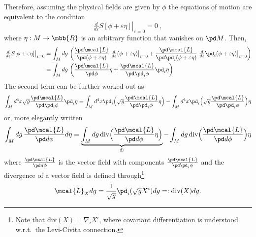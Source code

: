 \documentclass[11pt]{article}
\begin{document}
Therefore, assuming the physical fields are given by $\phi$ the 
equations of motion are equivalent to the condition
%
\begin{equation}\label{eq:ELeqs_cond}
	\left.\tfrac{d}{d\varepsilon} S[\phi + 
	\varepsilon\eta]\right|_{\varepsilon=0} = 0~,
\end{equation}
where $\eta : M \to \mbb{R}$ is an arbitrary function that 
vanishes on $\pd M$. Then,
%
\begin{align*}
	\left.\tfrac{d}{d\varepsilon} S[\phi + 
	\varepsilon\eta]\right|_{\varepsilon=0}
	&= \int_M dg\, \left(\frac{\pd\mcal{L}}{\pd(\phi + 
			\varepsilon\eta)} \left.\tfrac{d}{d\varepsilon}(\phi + 
		\varepsilon\eta)\right|_{\varepsilon=0} +
		\frac{\pd\mcal{L}}{\pd\pd_i(\phi+\varepsilon\eta)} 
		\left.\tfrac{d}{d\varepsilon}\pd_i(\phi + 
		\varepsilon\eta)\right|_{\varepsilon=0} \right) \\
	&= \int_M dg\, \left(\frac{\pd\mcal{L}}{\pd\phi}\eta + 
		\frac{\pd\mcal{L}}{\pd\pd_i\phi} \pd_i\eta \right) 
\end{align*}
The second term can be further worked out as
%
\begin{displaymath}
	\int_M d^4x \sqrt{g} \frac{\pd\mcal{L}}{\pd\pd_i\phi} 
	\pd_i\eta = \int_M d^4x \pd_i\Big(\sqrt{g} 
	\frac{\pd\mcal{L}}{\pd\pd_i\phi} \eta \Big) - \int_M d^4x 
	\pd_i \Big(\sqrt{g} \frac{\pd\mcal{L}}{\pd\pd_i\phi}\Big) \eta 
\end{displaymath}
or, more elegantly written
%
\begin{equation}\label{eq:EL_deriv1}
	\int_M dg\, \frac{\pd\mcal{L}}{\pd d\phi} d\eta
	= \underbrace{\int_M dg\, \mathrm{div}\Big( 
		\frac{\pd\mcal{L}}{\pd d\phi}\eta \Big)}_\text{\ding{172}} 
	- \int_M dg\, \mathrm{div}\Big( \frac{\pd\mcal{L}}{\pd d\phi} 
	\Big)\eta
\end{equation}
where $\frac{\pd\mcal{L}}{\pd d\phi}$ is the vector field with 
components $\frac{\pd\mcal{L}}{\pd\pd_i\phi}$ and the divergence 
of a vector field is defined through\footnote{Note that 
	$\mathrm{div}(X) = \nabla_i X^i$, where covariant 
	differentiation is understood w.r.t.~the Levi-Civita 
	connection.}
\begin{equation}\label{eq:div_def}
	\mcal{L}_X dg = \frac{1}{\sqrt{g}} \pd_i(\sqrt{g}X^i)dg =:
	\mathrm{div}(X)dg.
\end{equation}
\end{document}
